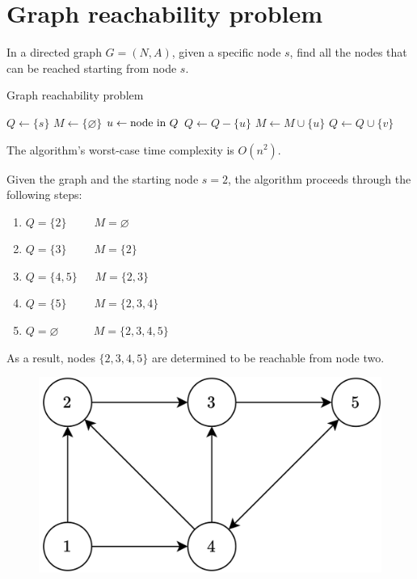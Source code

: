 \section{Graph reachability problem}

In a directed graph $G=(N,A)$, given a specific node $s$, find all the nodes that can be reached starting from node $s$.
\begin{algorithm}[H]
    \caption{Graph reachability problem}
        \begin{algorithmic}[1]
            \State $Q \leftarrow \{s\}$
            \State $M \leftarrow \{\varnothing\}$
                \State $u \leftarrow \textnormal{node in } Q$
                \State $Q \leftarrow Q-\{u\}$
                \State $M \leftarrow M \cup \{u\}$
                        \State $Q \leftarrow Q \cup \{v\}$
                    \EndIf
                \EndFor
            \EndWhile
        \end{algorithmic}
\end{algorithm}
The algorithm's worst-case time complexity is $O(n^2)$. 
\begin{example}
    Given the graph and the starting node $s=2$, the algorithm proceeds through the following steps:
    \begin{enumerate}
        \item $Q=\{2\} \:\:\:\:\:\:\:\:\:\:\: M=\varnothing$
        \item $Q=\{3\} \:\:\:\:\:\:\:\:\:\:\: M=\{2\}$
        \item $Q=\{4,5\} \:\:\:\:\:\:\: M=\{2,3\}$
        \item $Q=\{5\} \:\:\:\:\:\:\:\:\:\:\: M=\{2,3,4\}$
        \item $Q=\varnothing \:\:\:\:\:\:\:\:\:\:\:\:\:\: M=\{2,3,4,5\}$
    \end{enumerate}
    As a result, nodes $\{2,3,4,5\}$ are determined to be reachable from node two.
    \begin{figure}[H]
        \centering
        \includegraphics[width=0.3\linewidth]{images/graphs.png}
    \end{figure}
\end{example}